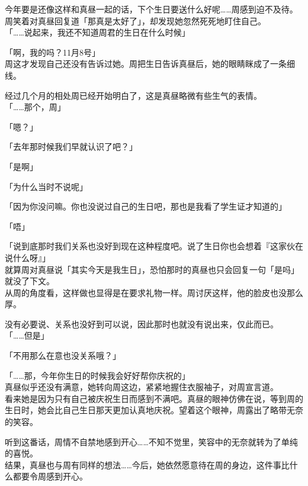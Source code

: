 今年要是还像这样和真昼一起的话，下个生日要送什么好呢……周感到迫不及待。\\

周笑着对真昼回复道「那真是太好了」，却发现她忽然死死地盯住自己。\\

「……说起来，我还不知道周君的生日在什么时候」

「啊，我的吗？11月8号」\\

周这才发现自己还没有告诉过她。周把生日告诉真昼后，她的眼睛眯成了一条细线。

经过几个月的相处周已经开始明白了，这是真昼略微有些生气的表情。\\

「……那个，周」

「嗯？」

「去年那时候我们早就认识了吧？」

「是啊」

「为什么当时不说呢」

「因为你没问嘛。你也没说过自己的生日吧，那也是我看了学生证才知道的」

「唔」

「说到底那时我们关系也没好到现在这种程度吧。说了生日你也会想着『这家伙在说什么呀』」\\

就算周对真昼说「其实今天是我生日」，恐怕那时的真昼也只会回复一句「是吗」就没了下文。\\

从周的角度看，这样做也显得是在要求礼物一样。周讨厌这样，他的脸皮也没那么厚。

没有必要说、关系也没好到可以说，因此那时也就没有说出来，仅此而已。\\

「……但是」

「不用那么在意也没关系哦？」

「……那，今年你生日的时候我会好好帮你庆祝的」\\

真昼似乎还没有满意，她转向周这边，紧紧地握住衣服袖子，对周宣言道。\\

看来她是因为只有自己被庆祝生日而感到不满吧。真昼的眼神仿佛在说，等到周的生日时，她会比自己生日那天更加认真地庆祝。望着这个眼神，周露出了略带无奈的笑容。

听到这番话，周情不自禁地感到开心……不知不觉里，笑容中的无奈就转为了单纯的喜悦。\\

结果，真昼也与周有同样的想法……今后，她依然愿意待在周的身边，这件事比什么都要令周感到开心。\\

